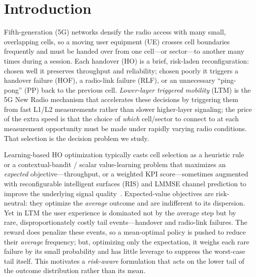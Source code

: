 \documentclass[conference]{IEEEtran}
\begin{document}
\section{Introduction}

Fifth-generation (5G) networks densify the radio access with many small, overlapping cells, so a moving user equipment (UE) crosses cell boundaries frequently and must be handed over from one cell---or sector---to another many times during a session.
Each handover (HO) is a brief, risk-laden reconfiguration: chosen well it preserves throughput and reliability; chosen poorly it triggers a handover failure (HOF), a radio-link failure (RLF), or an unnecessary ``ping-pong'' (PP) back to the previous cell.
\emph{Lower-layer triggered mobility} (LTM) is the 5G New Radio mechanism that accelerates these decisions by triggering them from fast L1/L2 measurements rather than slower higher-layer signaling; the price of the extra speed is that the choice of \emph{which} cell/sector to connect to at each measurement opportunity must be made under rapidly varying radio conditions.
That selection is the decision problem we study.

Learning-based HO optimization typically casts cell selection as a heuristic rule or a contextual-bandit / scalar value-learning problem that maximizes an \emph{expected} objective---throughput, or a weighted KPI score---sometimes augmented with reconfigurable intelligent surfaces (RIS) and LMMSE channel prediction to improve the underlying signal quality~\cite{cmab_ho}.
Expected-value objectives are risk-neutral: they optimize the \emph{average} outcome and are indifferent to its dispersion.
Yet in LTM the user experience is dominated not by the average step but by rare, disproportionately costly tail events---handover and radio-link failures. The reward does penalize these events, so a mean-optimal policy is pushed to reduce their \emph{average} frequency; but, optimizing only the expectation, it weighs each rare failure by its small probability and has little leverage to suppress the worst-case tail itself.
This motivates a \emph{risk-aware} formulation that acts on the lower tail of the outcome distribution rather than its mean.
\end{document}
